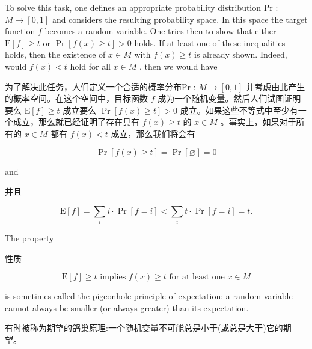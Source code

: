 \documentclass[10pt]{article}
\begin{document}
To solve this task, one defines an appropriate probability distribution Pr : \(M \rightarrow  \left\lbrack  {0,1}\right\rbrack\) and considers the resulting probability space. In this space the target function \(f\) becomes a random variable. One tries then to show that either \(\mathrm{E}\left\lbrack  f\right\rbrack   \geq  t\) or \(\Pr \left\lbrack  {f\left( x\right)  \geq  t}\right\rbrack   > 0\) holds. If at least one of these inequalities holds, then the existence of \(x \in  M\) with \(f\left( x\right)  \geq  t\) is already shown. Indeed, would \(f\left( x\right)  < t\) hold for all \(x \in  M\) , then we would have

\begin{tcolorbox}\relax
为了解决此任务，人们定义一个合适的概率分布Pr : \(M \rightarrow  \left\lbrack  {0,1}\right\rbrack\) 并考虑由此产生的概率空间。在这个空间中，目标函数 \(f\) 成为一个随机变量。然后人们试图证明要么 \(\mathrm{E}\left\lbrack  f\right\rbrack   \geq  t\) 成立要么 \(\Pr \left\lbrack  {f\left( x\right)  \geq  t}\right\rbrack   > 0\) 成立。如果这些不等式中至少有一个成立，那么就已经证明了存在具有 \(f\left( x\right)  \geq  t\) 的 \(x \in  M\) 。事实上，如果对于所有的 \(x \in  M\) 都有 \(f\left( x\right)  < t\) 成立，那么我们将会有
\end{tcolorbox}

\[
\Pr \left\lbrack  {f\left( x\right)  \geq  t}\right\rbrack   = \Pr \left\lbrack  \varnothing \right\rbrack   = 0
\]

and

\begin{tcolorbox}\relax
并且
\end{tcolorbox}

\[
\mathrm{E}\left\lbrack  f\right\rbrack   = \mathop{\sum }\limits_{i}i \cdot  \Pr \left\lbrack  {f = i}\right\rbrack   < \mathop{\sum }\limits_{i}t \cdot  \Pr \left\lbrack  {f = i}\right\rbrack   = t.
\]

The property

\begin{tcolorbox}\relax
性质
\end{tcolorbox}

\[
\mathrm{E}\left\lbrack  f\right\rbrack   \geq  t\text{ implies }f\left( x\right)  \geq  t\text{ for at least one }x \in  M
\]

is sometimes called the pigeonhole principle of expectation: a random variable cannot always be smaller (or always greater) than its expectation.

\begin{tcolorbox}\relax
有时被称为期望的鸽巢原理:一个随机变量不可能总是小于(或总是大于)它的期望。
\end{tcolorbox}
\end{document}
